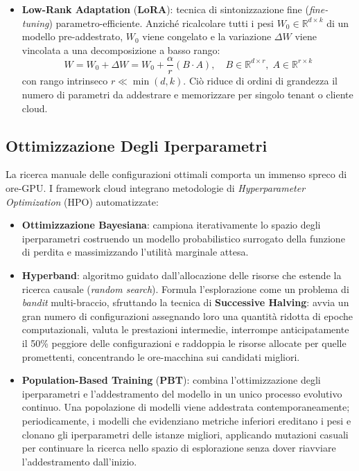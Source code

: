 \documentclass[11pt, a4paper]{article}
\begin{document}
\begin{itemize}
    \item \textbf{Low-Rank Adaptation} (\textbf{LoRA}): tecnica di sintonizzazione fine (\emph{fine-tuning}) parametro-efficiente. Anziché ricalcolare tutti i pesi $W_0 \in \mathbb{R}^{d \times k}$ di un modello pre-addestrato, $W_0$ viene congelato e la variazione $\Delta W$ viene vincolata a una decomposizione a basso rango:
    \begin{equation}
        W = W_0 + \Delta W = W_0 + \frac{\alpha}{r} (B \cdot A), \quad B \in \mathbb{R}^{d \times r}, \; A \in \mathbb{R}^{r \times k}
    \end{equation}
    con rango intrinseco $r \ll \min(d, k)$. Ciò riduce di ordini di grandezza il numero di parametri da addestrare e memorizzare per singolo tenant o cliente cloud.
\end{itemize}


\subsection{Ottimizzazione Degli Iperparametri}

La ricerca manuale delle configurazioni ottimali comporta un immenso spreco di ore-GPU. I framework cloud integrano metodologie di \emph{Hyperparameter Optimization} (HPO) automatizzate:
\begin{itemize}
    \item \textbf{Ottimizzazione Bayesiana}: campiona iterativamente lo spazio degli iperparametri costruendo un modello probabilistico surrogato della funzione di perdita e massimizzando l'utilità marginale attesa.
    \item \textbf{Hyperband}: algoritmo guidato dall'allocazione delle risorse che estende la ricerca causale (\emph{random search}). Formula l'esplorazione come un problema di \emph{bandit} multi-braccio, sfruttando la tecnica di \textbf{Successive Halving}: avvia un gran numero di configurazioni assegnando loro una quantità ridotta di epoche computazionali, valuta le prestazioni intermedie, interrompe anticipatamente il 50\% peggiore delle configurazioni e raddoppia le risorse allocate per quelle promettenti, concentrando le ore-macchina sui candidati migliori.
    \item \textbf{Population-Based Training} (\textbf{PBT}): combina l'ottimizzazione degli iperparametri e l'addestramento del modello in un unico processo evolutivo continuo. Una popolazione di modelli viene addestrata contemporaneamente; periodicamente, i modelli che evidenziano metriche inferiori ereditano i pesi e clonano gli iperparametri delle istanze migliori, applicando mutazioni casuali per continuare la ricerca nello spazio di esplorazione senza dover riavviare l'addestramento dall'inizio.
\end{itemize}
\end{document}
